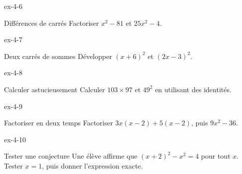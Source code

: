 \clearpage{}
\begin{blocLivre}{ex-4-6}\begin{exercice}[2]{Différences de carrés}
Factoriser $x^2-81$ et $25x^2-4$.
\end{exercice}\end{blocLivre}
\begin{blocLivre}{ex-4-7}\begin{exercice}[2]{Deux carrés de sommes}
Développer $(x+6)^2$ et $(2x-3)^2$.
\end{exercice}\end{blocLivre}
\begin{blocLivre}{ex-4-8}\begin{exercice}[2]{Calculer astucieusement}
Calculer $103\times97$ et $49^2$ en utilisant des identités.
\end{exercice}\end{blocLivre}
\begin{blocLivre}{ex-4-9}\begin{exercice}[2]{Factoriser en deux temps}
Factoriser $3x(x-2)+5(x-2)$, puis $9x^2-36$.
\end{exercice}\end{blocLivre}
\begin{blocLivre}{ex-4-10}\begin{exercice}[2]{Tester une conjecture}
Une élève affirme que $(x+2)^2-x^2=4$ pour tout $x$. Tester $x=1$, puis donner l’expression exacte.
\end{exercice}\end{blocLivre}

